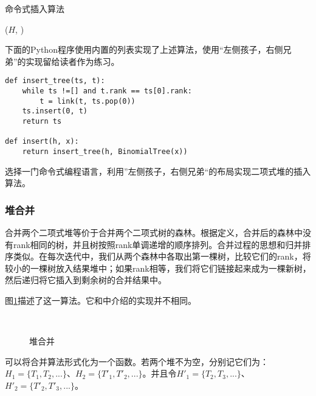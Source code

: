 \documentclass[UTF8]{article}
\begin{document}
\begin{algorithm}
\caption{命令式插入算法}
\label{alg:bheap-insert}
\begin{algorithmic}[1]
  \State \Return {}($H$, )
\EndFunction
\end{algorithmic}
\end{algorithm}

下面的Python程序使用内置的列表实现了上述算法，使用“左侧孩子，右侧兄弟”的实现留给读者作为练习。

\lstset{language=Python}
\begin{lstlisting}
def insert_tree(ts, t):
    while ts !=[] and t.rank == ts[0].rank:
        t = link(t, ts.pop(0))
    ts.insert(0, t)
    return ts

def insert(h, x):
    return insert_tree(h, BinomialTree(x))
\end{lstlisting}

\begin{Exercise}
选择一门命令式编程语言，利用”左侧孩子，右侧兄弟“的布局实现二项式堆的插入算法。
\end{Exercise}


\subsubsection{堆合并}

合并两个二项式堆等价于合并两个二项式树的森林。根据定义，合并后的森林中没有rank相同的树，并且树按照rank单调递增的顺序排列。合并过程的思想和归并排序类似。在每次迭代中，我们从两个森林中各取出第一棵树，比较它们的rank，将较小的一棵树放入结果堆中；如果rank相等，我们将它们链接起来成为一棵新树，然后递归将它插入到剩余树的合并结果中。

图\ref{fig:merge-bheaps}描述了这一算法。它和\cite{CLRS}中介绍的实现并不相同。

\begin{figure}[htbp]
  \centering
   \\
  \caption{堆合并} \label{fig:merge-bheaps}
\end{figure}

可以将合并算法形式化为一个函数。若两个堆不为空，分别记它们为：$H_1 = \{ T_1, T_2, ... \}$、$H_2 = \{ T'_1, T'_2, ...\}$。并且令$H'_1 = \{ T_2, T_3, ... \}$、$H'_2 = \{ T'_2, T'_3, ... \}$。
\end{document}
